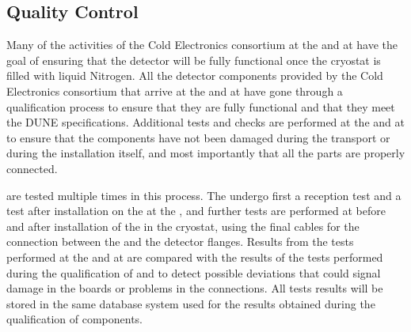 
\subsection{Quality Control}
\label{sec:fdsp-tpcelec-integration-qc}

Many of the activities of the Cold Electronics
consortium at the  and at \surf have the goal of 
ensuring that the detector will be fully functional once the cryostat
is filled with liquid Nitrogen. All the detector components provided
by the Cold Electronics consortium that arrive at the 
and at \surf have gone through a qualification process to ensure
that they are fully functional and that they meet the DUNE 
specifications. Additional tests and checks are performed at the
 and at \surf to ensure that the components have not
been damaged during the transport or during the installation itself,
and most importantly that all the parts are properly connected.

 are tested multiple times in this process. 
The  undergo first a reception test and a test after 
installation on the  at the , and further 
tests are performed at \surf before and after installation of the 
 in the cryostat, using the final cables for the 
connection between the  and the detector flanges. 
Results from the tests performed at
the  and at \surf are compared with the results of the
tests performed during the qualification of  and
 to detect possible deviations that could signal 
damage in the boards or problems in the connections. All tests 
results will be stored in the same database system used for
the results obtained during the qualification of components.

